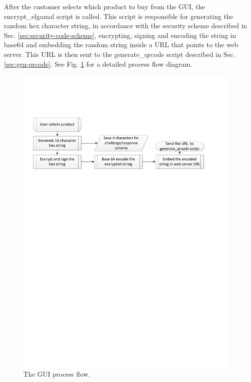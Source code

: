 After the customer selects which product to buy from the GUI, the
encrypt\_elgamal script is called. This script is responsible for generating the
random hex character string, in accordance with the security scheme described in
Sec. \ref{sec:security-code-scheme}, encrypting, signing and encoding the
string in base64 and embedding the random string inside a URL that points to the web
server. This URL is then sent to the generate\_qrcode script described in Sec.
\ref{sec:gen-qrcode}. See Fig. \ref{fig:gen-prod-code-processflow} for a detailed process
flow diagram.

\begin{figure}
 \centering 
 \includegraphics[clip=true, trim = 0 570 50 120, scale=0.7]{gui_processflow}
 \caption{The GUI process flow.}
 \label{fig:gen-prod-code-processflow}
\end{figure}

